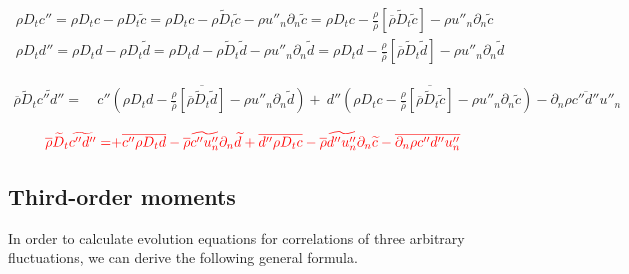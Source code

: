 \documentclass[10pt,paper=a4]{report}
\newcommand{\eht}{\overline}
\newcommand{\fht}{\widetilde}
\begin{document}
\begin{align}
\rho D_t c'' = \rho D_t c - \rho D_t \fht{c} = \rho D_t c - \rho \fht{D}_t \fht{c} - \rho u''_n \partial_n \fht{c} =  \rho D_t c - \frac{\rho}{\eht{\rho}} \left[ \eht{\rho} \fht{D}_t \fht{c} \right] - \rho u''_n \partial_n \fht{c} \\
\rho D_t d'' = \rho D_t d - \rho D_t \fht{d} = \rho D_t d - \rho \fht{D}_t \fht{d} - \rho u''_n \partial_n \fht{d} =  \rho D_t d - \frac{\rho}{\eht{\rho}} \left[ \eht{\rho} \fht{D}_t \fht{d} \right] - \rho u''_n \partial_n \fht{d}  
\end{align}

\begin{align}
\eht{\rho}\fht{D}_t \fht{c''d''} =  & \ \eht{c''\left(\rho D_t d - \frac{\rho}{\eht{\rho}}\left[\eht{\rho}\fht{D}_t \fht{d} \right] - \rho u''_n\partial_n\fht{d} \right)} + \ \eht{d''\left(\rho D_t c - \frac{\rho}{\eht{\rho}}\left[\eht{\rho}\fht{D}_t \fht{c} \right] - \rho u''_n\partial_n\fht{c} \right)} - \eht{\partial_n {\rho c''d'' u''_n}}
\end{align}

\begin{align}
{\color{red} \eht{\rho}\fht{D}_t \fht{c''d''} = } & {\color{red} +\eht{c''\rho D_t d} - \eht{\rho}\fht{c''u''_n}\partial_n\fht{d} + \eht{d''\rho D_t c} - \eht{\rho}\fht{d''u''_n}\partial_n\fht{c} - \eht{\partial_n{\rho c''d'' u''_n}} }
\label{eq:second-order-moments}
\end{align}

\fontsize{12pt}{20pt}

\newpage

\subsection{Third-order moments}

In order to calculate evolution equations for correlations of three arbitrary fluctuations, we can derive the following general formula.

\fontsize{11pt}{20pt}
\end{document}
